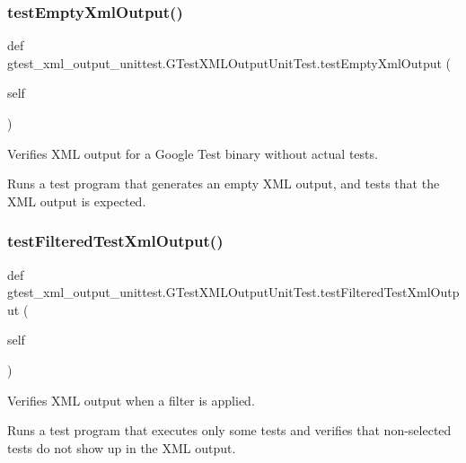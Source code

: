 \subsubsection{\texorpdfstring{testEmptyXmlOutput()}{testEmptyXmlOutput()}}
{\footnotesize\ttfamily def gtest\+\_\+xml\+\_\+output\+\_\+unittest.\+G\+Test\+X\+M\+L\+Output\+Unit\+Test.\+test\+Empty\+Xml\+Output (\begin{DoxyParamCaption}\item[{}]{self }\end{DoxyParamCaption})}

\begin{DoxyVerb}Verifies XML output for a Google Test binary without actual tests.

Runs a test program that generates an empty XML output, and
tests that the XML output is expected.
\end{DoxyVerb}
 \mbox{\label{classgtest__xml__output__unittest_1_1GTestXMLOutputUnitTest_a572b6d49e8f4d646ebdadcced3d260ef}} 
\subsubsection{\texorpdfstring{testFilteredTestXmlOutput()}{testFilteredTestXmlOutput()}}
{\footnotesize\ttfamily def gtest\+\_\+xml\+\_\+output\+\_\+unittest.\+G\+Test\+X\+M\+L\+Output\+Unit\+Test.\+test\+Filtered\+Test\+Xml\+Output (\begin{DoxyParamCaption}\item[{}]{self }\end{DoxyParamCaption})}

\begin{DoxyVerb}Verifies XML output when a filter is applied.

Runs a test program that executes only some tests and verifies that
non-selected tests do not show up in the XML output.
\end{DoxyVerb}
 \mbox{\label{classgtest__xml__output__unittest_1_1GTestXMLOutputUnitTest_a310c136c1eb2b421f57651a7d358b17a}} 
